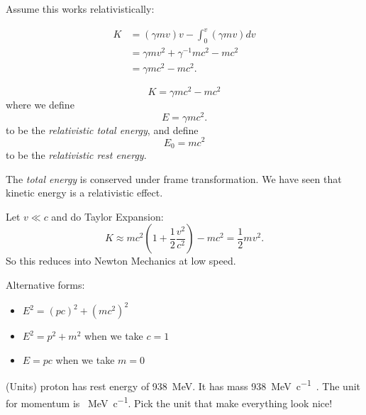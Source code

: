 Assume this works relativistically:

 \begin{align*}
	 K &= (\gamma mv)v - \int_0^v (\gamma mv) dv\\
	 &= \gamma m v^2 + \gamma^{ -1 } m c^2 - m c^2 \\
	 &= \gamma m c^2 - m c^2
.\end{align*} 

\begin{definition}
	\[
		K = \gamma m c^2 - m c^2
	\]
	where we define
	\[
		E = \gamma m c^2
	.\]  
	to be the \textit{relativistic total energy}, and define \[
		E_0 = m c^2
	\] to be the \textit{relativistic rest energy}.

\end{definition}
The \textit{total energy} is conserved under frame transformation. 
We have seen that kinetic energy is a relativistic effect.


Let $v\ll c$ and do Taylor Expansion:
\[
	K \approx m c^2 (1 + \frac{1}{2}\frac{v^2}{c^2}) - m c^2 = \frac{1}{2} m v^2
.\]
So this reduces into Newton Mechanics at low speed.

\begin{remark}
	Alternative forms: 
	\begin{itemize}
		\item $E^2 = (pc)^2 + \left(mc^2\right)^2$
		\item $E^2 = p^2 + m^2$ when we take $c=1$ 
		\item $E = pc$ when we take $m=0$
	\end{itemize}
\end{remark}

\begin{remark}(Units)
	proton has rest energy of  \SI{938}{\mega\electronvolt}. It has mass \SI{938}{\mega\electronvolt\per c \squared}. The unit for momentum is \SI{}{\mega \electronvolt \per c}. \color{blue} Pick the unit that make everything look nice!
\end{remark}


